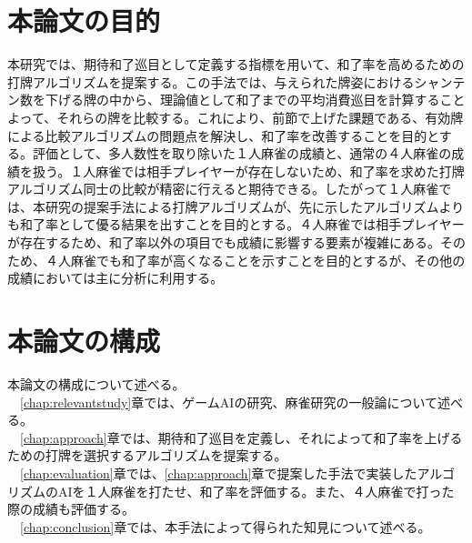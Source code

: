 \section{本論文の目的}
本研究では、期待和了巡目として定義する指標を用いて、和了率を高めるための打牌アルゴリズムを提案する。この手法では、与えられた牌姿におけるシャンテン数を下げる牌の中から、理論値として和了までの平均消費巡目を計算することよって、それらの牌を比較する。これにより、前節で上げた課題である、有効牌による比較アルゴリズムの問題点を解決し、和了率を改善することを目的とする。評価として、多人数性を取り除いた１人麻雀の成績と、通常の４人麻雀の成績を扱う。１人麻雀では相手プレイヤーが存在しないため、和了率を求めた打牌アルゴリズム同士の比較が精密に行えると期待できる。したがって１人麻雀では、本研究の提案手法による打牌アルゴリズムが、先に示したアルゴリズムよりも和了率として優る結果を出すことを目的とする。４人麻雀では相手プレイヤーが存在するため、和了率以外の項目でも成績に影響する要素が複雑にある。そのため、４人麻雀でも和了率が高くなることを示すことを目的とするが、その他の成績においては主に分析に利用する。
\section{本論文の構成}
本論文の構成について述べる。
\\　\ref{chap:relevantstudy}章では、ゲームAIの研究、麻雀研究の一般論について述べる。
\\　\ref{chap:approach}章では、期待和了巡目を定義し、それによって和了率を上げるための打牌を選択するアルゴリズムを提案する。
\\　\ref{chap:evaluation}章では、\ref{chap:approach}章で提案した手法で実装したアルゴリズムのAIを１人麻雀を打たせ、和了率を評価する。また、４人麻雀で打った際の成績も評価する。
\\　\ref{chap:conclusion}章では、本手法によって得られた知見について述べる。
